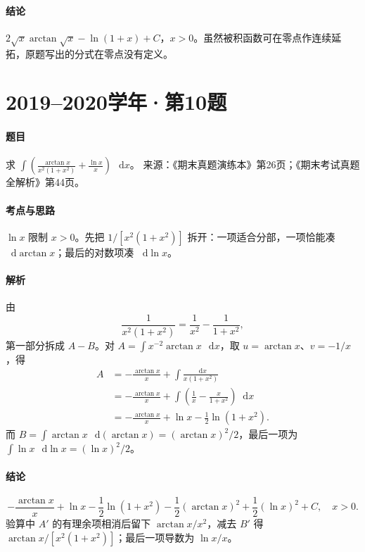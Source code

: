\documentclass[UTF8,fontset=fandol,12pt,oneside,openany]{ctexrep}
\newcommand{\dd}{\mathop{}\!\mathrm d}
\theoremstyle{definition}
\begin{document}
\paragraph{结论}$\boxed{2\sqrt{x}\arctan\sqrt{x}-\ln(1+x)+C}$，$x>0$。虽然被积函数可在零点作连续延拓，原题写出的分式在零点没有定义。

\par\addvspace{18pt}\noindent\begin{minipage}{\linewidth}
\section{2019--2020学年·第10题}
\paragraph{题目}求 $\displaystyle\int\left(\frac{\arctan x}{x^2(1+x^2)}+\frac{\ln x}{x}\right)\,\dd x$。
来源：《期末真题演练本》第26页；《期末考试真题全解析》第44页。
\end{minipage}\par
\paragraph{考点与思路}$\ln x$ 限制 $x>0$。先把 $1/[x^2(1+x^2)]$ 拆开：一项适合分部，一项恰能凑 $\dd\arctan x$；最后的对数项凑 $\dd\ln x$。
\paragraph{解析}由
\[
\frac1{x^2(1+x^2)}=\frac1{x^2}-\frac1{1+x^2},
\]
第一部分拆成 $A-B$。对 $A=\int x^{-2}\arctan x\,\dd x$，取 $u=\arctan x$、$v=-1/x$，得
\begin{align*}
A&=-\frac{\arctan x}{x}+\int\frac{\dd x}{x(1+x^2)}\\
&=-\frac{\arctan x}{x}+\int\left(\frac1x-\frac{x}{1+x^2}\right)\dd x\\
&=-\frac{\arctan x}{x}+\ln x-\frac12\ln(1+x^2).
\end{align*}
而 $B=\int\arctan x\,\dd(\arctan x)=(\arctan x)^2/2$，最后一项为 $\int\ln x\,\dd\ln x=(\ln x)^2/2$。
\paragraph{结论}
\[
\boxed{-\frac{\arctan x}{x}+\ln x-\frac12\ln(1+x^2)
-\frac12(\arctan x)^2+\frac12(\ln x)^2+C},\quad x>0.
\]
验算中 $A'$ 的有理余项相消后留下 $\arctan x/x^2$，减去 $B'$ 得 $\arctan x/[x^2(1+x^2)]$；最后一项导数为 $\ln x/x$。
\end{document}
